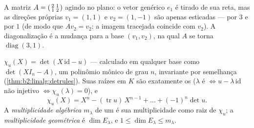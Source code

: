 \begin{omfigure}

{\small A matriz $A = \begin{psmallmatrix}2 & 1\\ 1 &
2\end{psmallmatrix}$ agindo no plano: o vetor genérico
$e_1$ é tirado de sua reta, mas as direções próprias $v_1 =
(1,1)$ e $v_2 = (1,-1)$ são apenas esticadas --- por $3$ e por
$1$ (de modo que $Av_2 = v_2$: a imagem tracejada coincide com $v_2$).
A diagonalização é a mudança para a base $(v_1, v_2)$, na qual
$A$ se torna $\operatorname{diag}(3, 1)$.}
\end{omfigure}

\begin{definition}\label{def:b2:reduction:charpoly}
$\chi_u(X) = \det(X\,\mathrm{id} - u)$ --- calculado em qualquer base como $\det(XI_n - A)$, um polinômio
mônico de grau $n$, invariante por semelhança
(\cref{thm:b2:linalg:detrules}). Suas raízes em $K$ são exatamente os
 ($\lambda$ é  $\iff u - \lambda\,\mathrm{id}$
não injetivo $\iff \chi_u(\lambda) = 0$), e
\[
\chi_u(X) = X^n - (\operatorname{tr} u)\, X^{n-1} + \dots +
(-1)^n \det u .
\]
A \emph{multiplicidade algébrica}
$m_\lambda$ de um  é
sua multiplicidade como raiz de $\chi_u$; a \emph{multiplicidade
geométrica} é $\dim E_\lambda$, e $1 \leq \dim E_\lambda \leq
m_\lambda$.
\end{definition}

